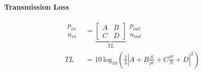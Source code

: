 \documentclass[ignorenonframetext]{beamer}
\begin{document}
\begin{frame}
\frametitle{}
\framesubtitle{\hspace{1.55cm}
Transmission Loss
}
  \begin{align*}
	\begin{matrix}
  	p_{in}\\
  	u_{in} 
    \end{matrix}
  	&=
  	\underbrace{ 
  	\left[
	\begin{matrix}
	A & B\\
	C & D
	\end{matrix} 
	\right]
	}_{TL}
	\begin{matrix}
  	p_{out}\\
  	u_{out} 
    \end{matrix}
	\\
	TL &= 10\, \text{log}_{10}\left(\frac{1}{4}\left|A+B\frac{S}{\rho c}+C\frac{\rho c}{S}+D\right|^2\right)
  \end{align*}
\end{frame}
\end{document}
